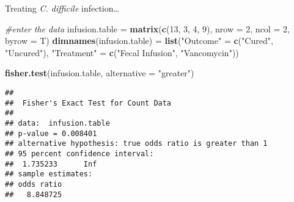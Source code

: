 \documentclass[
  ignorenonframetext,
  aspectratio=169]{beamer}
\newenvironment{Shaded}{\begin{snugshade}}{\end{snugshade}}
\newcommand{\AttributeTok}[1]{\textcolor[rgb]{0.13,0.29,0.53}{#1}}
\newcommand{\CommentTok}[1]{\textcolor[rgb]{0.56,0.35,0.01}{\textit{#1}}}
\newcommand{\DecValTok}[1]{\textcolor[rgb]{0.00,0.00,0.81}{#1}}
\newcommand{\FunctionTok}[1]{\textcolor[rgb]{0.13,0.29,0.53}{\textbf{#1}}}
\newcommand{\NormalTok}[1]{#1}
\newcommand{\OtherTok}[1]{\textcolor[rgb]{0.56,0.35,0.01}{#1}}
\newcommand{\StringTok}[1]{\textcolor[rgb]{0.31,0.60,0.02}{#1}}
\begin{document}
\begin{frame}[fragile]{Treating \emph{C. difficile} infection\ldots{}}
\protect\hypertarget{treating-c.-difficile-infection-2}{}
\scriptsize

\begin{Shaded}
\begin{Highlighting}[]
\CommentTok{\#enter the data}
\NormalTok{infusion.table }\OtherTok{=} \FunctionTok{matrix}\NormalTok{(}\FunctionTok{c}\NormalTok{(}\DecValTok{13}\NormalTok{, }\DecValTok{3}\NormalTok{, }\DecValTok{4}\NormalTok{, }\DecValTok{9}\NormalTok{), }\AttributeTok{nrow =} \DecValTok{2}\NormalTok{, }\AttributeTok{ncol =} \DecValTok{2}\NormalTok{, }\AttributeTok{byrow =}\NormalTok{ T)}
\FunctionTok{dimnames}\NormalTok{(infusion.table) }\OtherTok{=} \FunctionTok{list}\NormalTok{(}\StringTok{"Outcome"} \OtherTok{=} \FunctionTok{c}\NormalTok{(}\StringTok{"Cured"}\NormalTok{, }\StringTok{"Uncured"}\NormalTok{),}
                                \StringTok{"Treatment"} \OtherTok{=} \FunctionTok{c}\NormalTok{(}\StringTok{"Fecal Infusion"}\NormalTok{, }
                                                \StringTok{"Vancomycin"}\NormalTok{))}

\FunctionTok{fisher.test}\NormalTok{(infusion.table, }\AttributeTok{alternative =} \StringTok{"greater"}\NormalTok{)}
\end{Highlighting}
\end{Shaded}

\begin{verbatim}
## 
##  Fisher's Exact Test for Count Data
## 
## data:  infusion.table
## p-value = 0.008401
## alternative hypothesis: true odds ratio is greater than 1
## 95 percent confidence interval:
##  1.735233      Inf
## sample estimates:
## odds ratio 
##   8.848725
\end{verbatim}
\end{frame}
\end{document}
